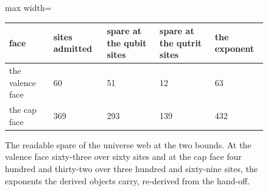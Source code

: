 \begin{figure}[h]
\centering
\begin{adjustbox}{max width=\linewidth}\begin{tabular}{lllll}
\hline
face & sites admitted & spare at the qubit sites & spare at the qutrit sites & the exponent \\
\hline
the valence face & 60 & 51 & 12 & 63 \\
the cap face & 369 & 293 & 139 & 432 \\
\hline
\end{tabular}\end{adjustbox}
\caption{The readable spare of the universe web at the two bounds. At the valence face sixty-three over sixty sites and at the cap face four hundred and thirty-two over three hundred and sixty-nine sites, the exponents the derived objects carry, re-derived from the hand-off.}
\end{figure}
